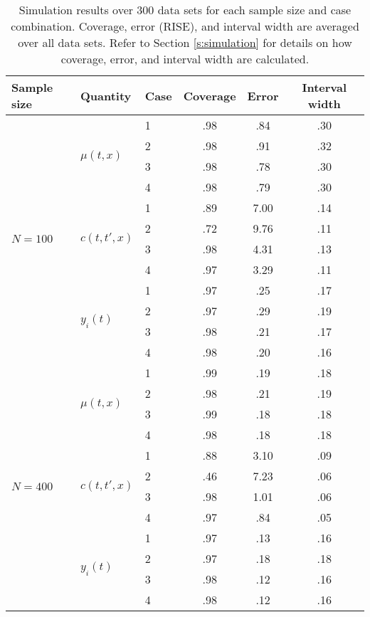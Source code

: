 \documentclass[useAMS,referee,usenatbib]{biom}
\begin{document}
\begin{table}
	\caption{Simulation results over 300 data sets for each sample size and case combination. Coverage, error (RISE), and interval width are averaged over all data sets. Refer to Section \ref{s:simulation} for details on how coverage, error, and interval width are calculated.}
	\label{t:simulation}
	\begin{center}
		\begin{tabular}{lllccc}
			\Hline
			 Sample size & Quantity &Case & Coverage&  Error &  Interval width\\ \hline
			\multirow{12}{*}{$N=100$} & \multirow{4}{*}{$\mu(t,x)$}  & 1 &  .98&  .84& .30 \\
			&& 2 & .98& .91& .32 \\
			&& 3 & .98& .78& .30\\
			&& 4 & .98& .79& .30\\
			\cline{2-6}
			&\multirow{4}{*}{$c(t,t',x)$} & 1 & .89& 7.00& .14\\
			&& 2 &.72&9.76&.11\\
			&& 3 &.98&4.31&.13\\
			&& 4 &.97&3.29&.11\\
			\cline{2-6}
			&\multirow{4}{*}{$y_{i}(t)$} & 1 & .97& .25& .17\\
			&& 2 &.97&.29&.19\\
			&& 3 &.98&.21&.17\\
			&& 4 &.98&.20&.16\\
			\hline
			\multirow{12}{*}{$N=400$} & \multirow{4}{*}{$\mu(t,x)$}  & 1 &.99 & .19& .18 \\
			&& 2 & .98& .21& .19 \\
			&& 3 &.99 & .18& .18 \\
			&& 4 &.98 & .18& .18\\
			\cline{2-6}
			&\multirow{4}{*}{$c(t,t',x)$} & 1 & .88 & 3.10& .09\\
			&& 2 & .46&7.23&.06\\
			&& 3 &.98&1.01&.06\\
			&& 4 &.97&.84&.05\\
			\cline{2-6}
			&\multirow{4}{*}{$y_{i}(t)$} & 1 &.97 & .13 &.16 \\
			&& 2 &.97&.18&.18\\
			&& 3 &.98&.12&.16\\
			&& 4 &.98&.12&.16\\
		\end{tabular}
	\end{center}
\end{table}
\end{document}
